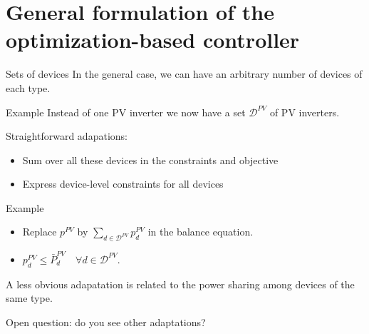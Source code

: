 \section[General formulation of the optimization-based controller]{General formulation of the\\ optimization-based controller}

\begin{frame}[allowframebreaks]{Sets of devices}
In the general case, we can have an arbitrary number of devices of each type.
\begin{block}{Example}
Instead of one PV inverter we now have a set $\mathcal{D}^{PV}$ of PV inverters.
\end{block}

Straightforward adapations: 
\begin{itemize}
    \item Sum over all these devices in the constraints and objective
    \item Express device-level constraints for all devices
\end{itemize}

\begin{block}{Example}
\begin{itemize}
    \item Replace $p^{PV}$ by $\sum_{d \in \mathcal{D}^{PV}} p^{PV}_d$ in the balance equation.
    \item $p^{PV}_d \leq \bar{P}^{PV}_d \quad \forall d \in \mathcal{D}^{PV}$.
\end{itemize}
    
\end{block}

A less obvious adapatation is related to the power sharing among devices of the same type.

Open question: do you see other adaptations? 
\end{frame}

